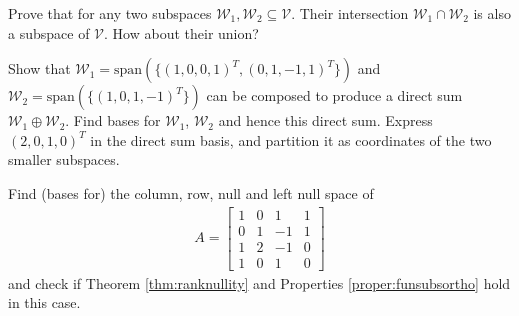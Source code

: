 \begin{Exercise}
Prove that for any two subspaces $\mathcal{W}_1, \mathcal{W}_2 \subseteq \mathcal{V}$. Their intersection $\mathcal{W}_1 \cap \mathcal{W}_2$ is also a subspace of $\mathcal{V}$. How about their union?
\end{Exercise}

\begin{Exercise}
Show that $\mathcal{W}_1 = \text{span}(\{(1,0,0,1)^T, (0,1,-1,1)^T\})$ and $\mathcal{W}_2 = \text{span}(\{(1,0,1,-1)^T\})$ can be composed to produce a direct sum $\mathcal{W}_1 \oplus \mathcal{W}_2$. Find bases for $\mathcal{W}_1$, $\mathcal{W}_2$ and hence this direct sum. Express $(2,0,1,0)^T$ in the direct sum basis, and partition it as coordinates of the two smaller subspaces.
\end{Exercise}

\begin{Exercise}
Find (bases for) the column, row, null and left null space of 
\begin{align*}
A = 
\begin{bmatrix}
1 & 0 & 1 & 1 \\
0 & 1 & -1 & 1 \\
1 & 2 & -1 & 0 \\
1 & 0 & 1 & 0
\end{bmatrix}
\end{align*}
and check if Theorem \ref{thm:ranknullity} and Properties \ref{proper:funsubsortho} hold in this case.
\end{Exercise}